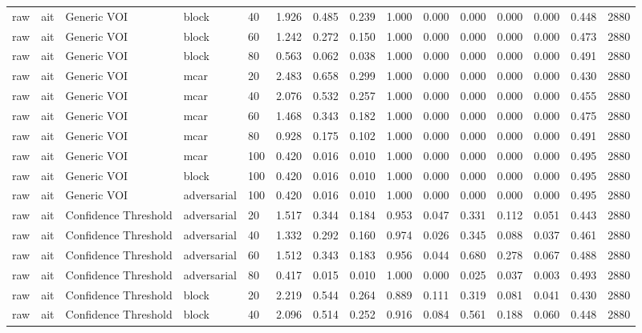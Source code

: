 \begin{table}[!ht]
{\begin{tabular}{lllllllllllllll}
raw & ait & Generic VOI & block & 40 & 1.926 & 0.485 & 0.239 & 1.000 & 0.000 & 0.000 & 0.000 & 0.000 & 0.448 & 2880 \\
raw & ait & Generic VOI & block & 60 & 1.242 & 0.272 & 0.150 & 1.000 & 0.000 & 0.000 & 0.000 & 0.000 & 0.473 & 2880 \\
raw & ait & Generic VOI & block & 80 & 0.563 & 0.062 & 0.038 & 1.000 & 0.000 & 0.000 & 0.000 & 0.000 & 0.491 & 2880 \\
raw & ait & Generic VOI & mcar & 20 & 2.483 & 0.658 & 0.299 & 1.000 & 0.000 & 0.000 & 0.000 & 0.000 & 0.430 & 2880 \\
raw & ait & Generic VOI & mcar & 40 & 2.076 & 0.532 & 0.257 & 1.000 & 0.000 & 0.000 & 0.000 & 0.000 & 0.455 & 2880 \\
raw & ait & Generic VOI & mcar & 60 & 1.468 & 0.343 & 0.182 & 1.000 & 0.000 & 0.000 & 0.000 & 0.000 & 0.475 & 2880 \\
raw & ait & Generic VOI & mcar & 80 & 0.928 & 0.175 & 0.102 & 1.000 & 0.000 & 0.000 & 0.000 & 0.000 & 0.491 & 2880 \\
raw & ait & Generic VOI & mcar & 100 & 0.420 & 0.016 & 0.010 & 1.000 & 0.000 & 0.000 & 0.000 & 0.000 & 0.495 & 2880 \\
raw & ait & Generic VOI & block & 100 & 0.420 & 0.016 & 0.010 & 1.000 & 0.000 & 0.000 & 0.000 & 0.000 & 0.495 & 2880 \\
raw & ait & Generic VOI & adversarial & 100 & 0.420 & 0.016 & 0.010 & 1.000 & 0.000 & 0.000 & 0.000 & 0.000 & 0.495 & 2880 \\
raw & ait & Confidence Threshold & adversarial & 20 & 1.517 & 0.344 & 0.184 & 0.953 & 0.047 & 0.331 & 0.112 & 0.051 & 0.443 & 2880 \\
raw & ait & Confidence Threshold & adversarial & 40 & 1.332 & 0.292 & 0.160 & 0.974 & 0.026 & 0.345 & 0.088 & 0.037 & 0.461 & 2880 \\
raw & ait & Confidence Threshold & adversarial & 60 & 1.512 & 0.343 & 0.183 & 0.956 & 0.044 & 0.680 & 0.278 & 0.067 & 0.488 & 2880 \\
raw & ait & Confidence Threshold & adversarial & 80 & 0.417 & 0.015 & 0.010 & 1.000 & 0.000 & 0.025 & 0.037 & 0.003 & 0.493 & 2880 \\
raw & ait & Confidence Threshold & block & 20 & 2.219 & 0.544 & 0.264 & 0.889 & 0.111 & 0.319 & 0.081 & 0.041 & 0.430 & 2880 \\
raw & ait & Confidence Threshold & block & 40 & 2.096 & 0.514 & 0.252 & 0.916 & 0.084 & 0.561 & 0.188 & 0.060 & 0.448 & 2880 \\

\end{tabular}}
\end{table}
